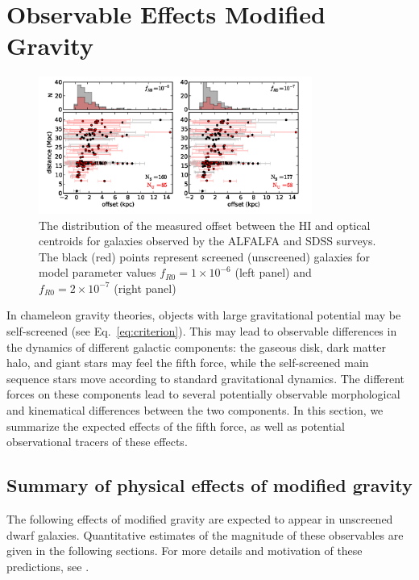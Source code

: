 \documentclass{emulateapj}
\begin{document}
\section{Observable Effects Modified Gravity}
\label{sec:test-summary} 

\begin{figure}[t]
\centering
\includegraphics[width=0.8\textwidth]{figures/Offset_HI_optical_scatter_jake.png}
\caption{The distribution of the measured offset between the HI and
optical centroids for galaxies observed by the ALFALFA and SDSS surveys.
The black (red) points represent screened (unscreened) galaxies for model
parameter values 
$f_{R0}=1\times10^{-6}$ (left panel) and $f_{R0}=2\times10^{-7}$ (right panel)}
\label{fig:offset}
\end{figure}


In chameleon gravity theories, objects with large gravitational potential
may be self-screened (see Eq.~\ref{eq:criterion}).  This may lead to observable
differences in the dynamics of different galactic components:  
the gaseous disk, dark matter halo, and giant
stars may feel the fifth force, while the self-screened main sequence
stars move according to standard gravitational dynamics.
The different forces on these components lead to several potentially observable
morphological and kinematical differences between the two components. In
this section, we summarize the expected effects of the fifth force, as well
as potential observational tracers of these effects.


\subsection{Summary of physical effects of modified gravity}
The following effects of modified gravity are expected to appear in 
unscreened dwarf galaxies.
Quantitative estimates of the magnitude of these
observables are given in the following sections.
For more details and motivation of these predictions, see \citet{bhuvjake2011}. 
\end{document}
